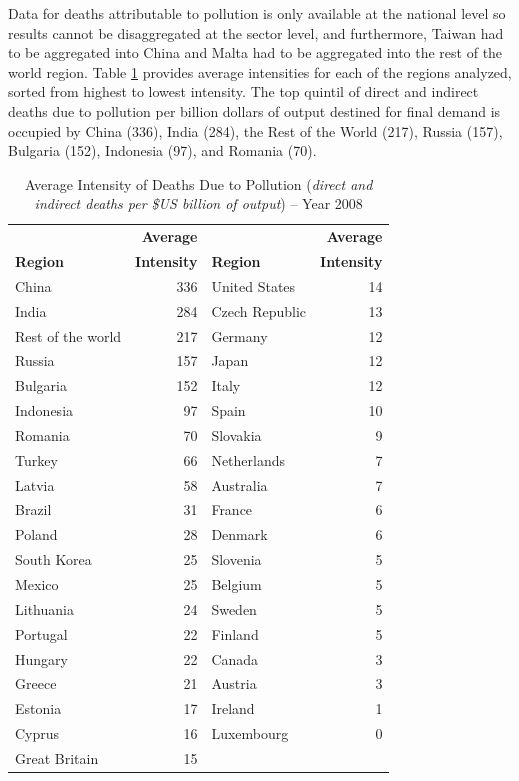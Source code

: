 \documentclass[a4paper,12pt, ]{article}
\begin{document}
Data for deaths attributable to pollution is only available at the national level so results cannot be disaggregated at the sector level, and furthermore, Taiwan had to be aggregated into China and Malta had to be aggregated into the rest of the world region. Table \ref{tab04} provides average intensities for each of the regions analyzed, sorted from highest to lowest intensity. The top quintil of direct and indirect deaths due to pollution per billion dollars of output destined for final demand is occupied by China (336), India (284), the Rest of the World (217), Russia (157), Bulgaria (152), Indonesia (97), and Romania (70).



\begin{table} [!hbtp] 
\caption{Average Intensity of Deaths Due to Pollution (\textit{direct and indirect deaths per \$US billion of output}) -- Year 2008} 
\begin{center}
\small \begin{tabular}{lrlr}
 & \textbf{Average} &  & \textbf{Average} \\ 
\textbf{Region} & \textbf{Intensity }& \textbf{Region} & \textbf{Intensity}\\ 
\hline
China & 336 & United States & 14\\ 
India & 284 & Czech Republic & 13\\ 
Rest of the world & 217 & Germany & 12\\ 
Russia & 157 & Japan & 12\\ 
Bulgaria & 152 & Italy & 12\\ 
Indonesia & 97 & Spain & 10\\ 
Romania & 70 & Slovakia & 9\\ 
Turkey & 66 & Netherlands & 7\\ 
Latvia & 58 & Australia & 7\\ 
Brazil & 31 & France & 6\\ 
Poland & 28 & Denmark & 6\\ 
South Korea & 25 & Slovenia & 5\\ 
Mexico & 25 & Belgium & 5\\ 
Lithuania & 24 & Sweden & 5\\ 
Portugal & 22 & Finland & 5\\ 
Hungary & 22 & Canada & 3\\ 
Greece & 21 & Austria & 3\\ 
Estonia & 17 & Ireland & 1\\ 
Cyprus & 16 & Luxembourg & 0\\ 
Great Britain & 15 &  &  \\
\hline
\end{tabular}
\label{tab04} 
\end{center}
\end{table}
\end{document}
